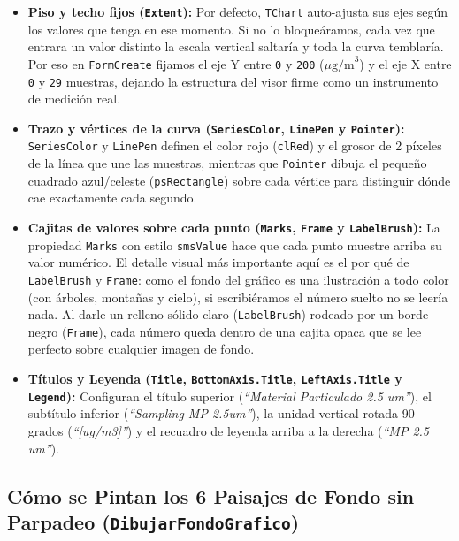 \documentclass[11pt,a4paper]{article}
\begin{document}
\begin{itemize}[leftmargin=1.5em, itemsep=0.3em]
    \item \textbf{Piso y techo fijos (\texttt{Extent}):}
    Por defecto, \texttt{TChart} auto-ajusta sus ejes según los valores que tenga en ese momento. Si no lo bloqueáramos, cada vez que entrara un valor distinto la escala vertical saltaría y toda la curva temblaría. Por eso en \texttt{FormCreate} fijamos el eje Y entre \texttt{0} y \texttt{200} ($\mu\text{g/m}^3$) y el eje X entre \texttt{0} y \texttt{29} muestras, dejando la estructura del visor firme como un instrumento de medición real.

    \item \textbf{Trazo y vértices de la curva (\texttt{SeriesColor}, \texttt{LinePen} y \texttt{Pointer}):}
    \texttt{SeriesColor} y \texttt{LinePen} definen el color rojo (\texttt{clRed}) y el grosor de 2 píxeles de la línea que une las muestras, mientras que \texttt{Pointer} dibuja el pequeño cuadrado azul/celeste (\texttt{psRectangle}) sobre cada vértice para distinguir dónde cae exactamente cada segundo.

    \item \textbf{Cajitas de valores sobre cada punto (\texttt{Marks}, \texttt{Frame} y \texttt{LabelBrush}):}
    La propiedad \texttt{Marks} con estilo \texttt{smsValue} hace que cada punto muestre arriba su valor numérico. El detalle visual más importante aquí es el por qué de \texttt{LabelBrush} y \texttt{Frame}: como el fondo del gráfico es una ilustración a todo color (con árboles, montañas y cielo), si escribiéramos el número suelto no se leería nada. Al darle un relleno sólido claro (\texttt{LabelBrush}) rodeado por un borde negro (\texttt{Frame}), cada número queda dentro de una cajita opaca que se lee perfecto sobre cualquier imagen de fondo.

    \item \textbf{Títulos y Leyenda (\texttt{Title}, \texttt{BottomAxis.Title}, \texttt{LeftAxis.Title} y \texttt{Legend}):}
    Configuran el título superior (\emph{``Material Particulado 2.5 um''}), el subtítulo inferior (\emph{``Sampling MP 2.5um''}), la unidad vertical rotada 90 grados (\emph{``[ug/m3]''}) y el recuadro de leyenda arriba a la derecha (\emph{``MP 2.5 um''}).
\end{itemize}

\subsection{Cómo se Pintan los 6 Paisajes de Fondo sin Parpadeo (\texttt{DibujarFondoGrafico})}
\end{document}

